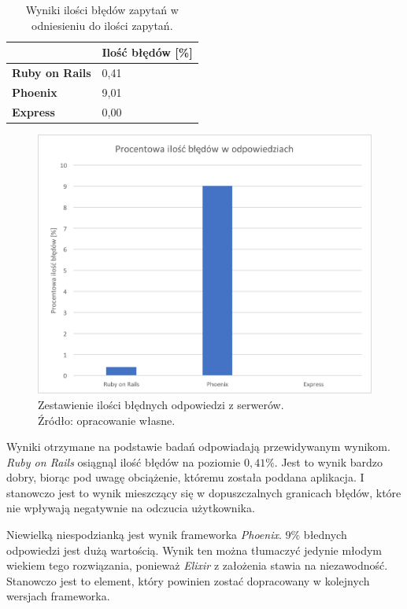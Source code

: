 \begin{table}[h]
\centering
\caption{Wyniki ilości błędów zapytań w odniesieniu do ilości zapytań.}
\label{tab:poprawnosc}
\begin{tabular}{|l|l|}
\hline
                       & \textbf{Ilość błędów [\%]} \\ \hline
\textbf{Ruby on Rails} & 0,41         \\ \hline
\textbf{Phoenix}       & 9,01         \\ \hline
\textbf{Express}       & 0,00        \\ \hline
\end{tabular}
\end{table}

\newpage

\begin{figure}[h]
  \centering
  \includegraphics[width=0.7\linewidth]{images/errors}
  \caption{Zestawienie ilości błędnych odpowiedzi z serwerów.\\Źródło: opracowanie własne.}
  \label{fig:rps}
\end{figure}

Wyniki otrzymane na podstawie badań odpowiadają przewidywanym wynikom. \emph{Ruby on Rails} osiągnąl ilość błędów na poziomie $0,41\%$. Jest to wynik bardzo dobry, biorąc pod uwagę obciążenie, któremu została poddana aplikacja. I stanowczo jest to wynik mieszczący się w dopuszczalnych granicach błędów, które nie wpływają negatywnie na odczucia użytkownika.

Niewielką niespodzianką jest wynik frameworka \emph{Phoenix}. $9\%$ błednych odpowiedzi jest dużą wartością. Wynik ten można tłumaczyć jedynie młodym wiekiem tego rozwiązania, ponieważ \emph{Elixir} z założenia stawia na niezawodność. Stanowczo jest to element, który powinien zostać dopracowany w kolejnych wersjach frameworka.

